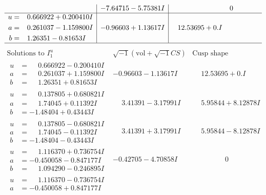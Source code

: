 \documentclass[1p]{elsarticle_modified}
\theoremstyle{definition}
\newcommand{\I}{\sqrt{-1}}
\begin{document}
$$\begin{array}{c|c|c}
 & -7.64715 - 5.75381 I & \phantom{-0.000000 } 0 \\ \hline\begin{aligned}
u &= \phantom{-}0.666922 + 0.200410 I \\
a &= \phantom{-}0.261037 - 1.159800 I \\
b &= \phantom{-}1.26351 - 0.81653 I\end{aligned}
 & -0.96603 + 1.13617 I & \phantom{-}12.53695 + 0. I\phantom{ +0.000000I}\\
 \hline 
 \end{array}$$\newpage$$\begin{array}{c|c|c}  
\text{Solutions to }I^u_{1}& \I (\text{vol} + \sqrt{-1}CS) & \text{Cusp shape}\\
 \hline 
\begin{aligned}
u &= \phantom{-}0.666922 - 0.200410 I \\
a &= \phantom{-}0.261037 + 1.159800 I \\
b &= \phantom{-}1.26351 + 0.81653 I\end{aligned}
 & -0.96603 - 1.13617 I & \phantom{-}12.53695 + 0. I\phantom{ +0.000000I} \\ \hline\begin{aligned}
u &= \phantom{-}0.137805 + 0.680821 I \\
a &= \phantom{-}1.74045 + 0.11392 I \\
b &= -1.48404 + 0.43443 I\end{aligned}
 & \phantom{-}3.41391 - 3.17991 I & \phantom{-}5.95844 + 8.12878 I \\ \hline\begin{aligned}
u &= \phantom{-}0.137805 - 0.680821 I \\
a &= \phantom{-}1.74045 - 0.11392 I \\
b &= -1.48404 - 0.43443 I\end{aligned}
 & \phantom{-}3.41391 + 3.17991 I & \phantom{-}5.95844 - 8.12878 I \\ \hline\begin{aligned}
u &= \phantom{-}1.116370 + 0.736754 I \\
a &= -0.450058 - 0.847177 I \\
b &= \phantom{-}1.094290 - 0.246895 I\end{aligned}
 & -0.42705 - 4.70858 I & \phantom{-0.000000 } 0 \\ \hline\begin{aligned}
u &= \phantom{-}1.116370 - 0.736754 I \\
a &= -0.450058 + 0.847177 I \\

\end{aligned}
\end{array}$$
\end{document}
